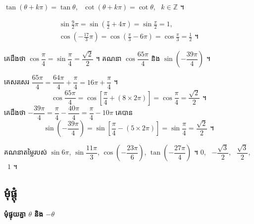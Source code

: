 \begin{note}[សម្គាល់]
$\tan(\theta + k\pi) = \tan\theta$, \ $\cot(\theta + k\pi) = \cot\theta$, \ $k \in \mathbb{Z}$ ។
\end{note}

\begin{example}[ឧទាហរណ៍]
\[
\begin{gathered}
\sin\frac{9}{2}\pi = \sin\left(\frac{\pi}{2} + 4\pi\right) = \sin\frac{\pi}{2} = 1,\\
\cos\left(-\frac{17}{3}\pi\right) = \cos\left(\frac{\pi}{3} - 6\pi\right) = \cos\frac{\pi}{3} = \frac{1}{2} \text{ ។}
\end{gathered}
\]
\end{example}

\begin{example}[លំហាត់គំរូ ៧]
គេដឹងថា $\cos\dfrac{\pi}{4} = \sin\dfrac{\pi}{4} = \dfrac{\sqrt{2}}{2}$ ។ គណនា $\cos\dfrac{65\pi}{4}$ និង $\sin\left(-\dfrac{39\pi}{4}\right)$ ។
\end{example}
\ans
គេសរសេរ $\dfrac{65\pi}{4} = \dfrac{64\pi}{4} + \dfrac{\pi}{4} = 16\pi + \dfrac{\pi}{4}$ ។
\[ \cos\frac{65\pi}{4} = \cos\left[\frac{\pi}{4} + (8 \times 2\pi)\right] = \cos\frac{\pi}{4} = \frac{\sqrt{2}}{2} \text{ ។} \]
គេដឹងថា $-\dfrac{39\pi}{4} = \dfrac{\pi}{4} - \dfrac{40\pi}{4} = \dfrac{\pi}{4} - 10\pi$ គេបាន
\[ \sin\left(-\frac{39\pi}{4}\right) = \sin\left[\frac{\pi}{4} - (5 \times 2\pi)\right] = \sin\frac{\pi}{4} = \frac{\sqrt{2}}{2} \text{ ។} \]

\begin{pro}
គណនាតម្លៃរបស់ $\sin 6\pi$, $\sin\dfrac{11\pi}{3}$, $\cos\left(-\dfrac{23\pi}{6}\right)$, $\tan\left(-\dfrac{27\pi}{4}\right)$ ។
\ans
$0$, \ $-\dfrac{\sqrt{3}}{2}$, \ $\dfrac{\sqrt{3}}{2}$, \ $1$ ។
\end{pro}

\subsection{មុំផ្តុំ}

\textbf{មុំផ្ទុយគ្នា $\theta$ និង $-\theta$}

